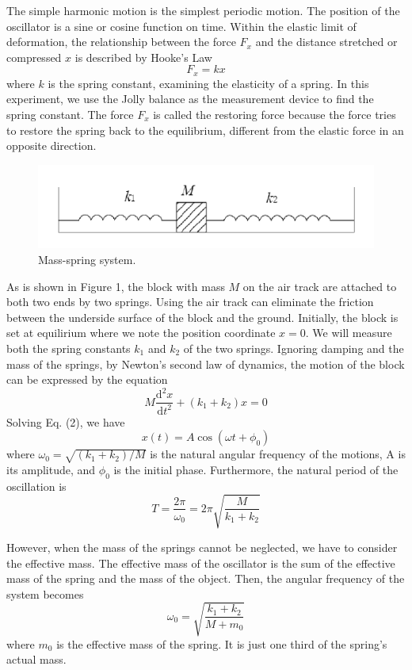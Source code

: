 \documentclass[a4paper]{report}
\begin{document}
	The simple harmonic motion is the simplest periodic motion. The position of the oscillator is a sine or cosine function on time. Within the elastic limit of deformation, the relationship between the force $F_x$ and the distance stretched or compressed $x$ is described by Hooke's Law
	\begin{equation}
	F_x=kx
	\end{equation}
	where $k$ is the spring constant, examining the elasticity of a spring. In this experiment, we use the Jolly balance as the measurement device to find the spring constant. The force $F_x$ is called the restoring force because the force tries to restore the spring back to the equilibrium, different from the elastic force in an opposite direction.
	\begin{figure}[H]
		\centering
		\includegraphics[width=0.5\linewidth]{1.png}
		\caption{Mass-spring system.}
	\end{figure}
	As is shown in Figure 1, the block with mass $M$ on the air track are attached to both two ends by two springs. Using the air track can eliminate the friction between the underside surface of the block and the ground. Initially, the block is set at equilirium where we note the position coordinate $x=0$. We will measure both the spring constants $k_1$ and $k_2$ of the two springs. Ignoring damping and the mass of the springs, by Newton's second law of dynamics, the motion of the block can be expressed by the equation
	\begin{equation}
	M\dfrac{\mathrm{d}^2x}{\mathrm{d}t^2}+(k_1+k_2)x=0
	\end{equation}
	Solving Eq. (2), we have
	\begin{equation}
	x(t)=A\cos(\omega t+\phi_0)
	\end{equation}
	where $\omega_0=\sqrt{(k_1+k_2)/M}$ is the natural angular frequency of the motions, A is its amplitude, and $\phi_0$ is the initial phase. Furthermore, the natural period of the oscillation is
	\begin{equation}
	T=\dfrac{2\pi}{\omega_0}=2\pi\sqrt{\dfrac{M}{k_1+k_2}}
	\end{equation}
	
	However,  when the mass of the springs cannot be neglected, we have to consider the effective mass. The effective mass of the oscillator is the sum of the effective mass of the spring and the mass of the object. Then, the angular frequency of the system becomes
	\begin{equation}
	\omega_0=\sqrt{\dfrac{k_1+k_2}{M+m_0}}
	\end{equation}
	where $m_0$ is the effective mass of the spring. It is just one third of the spring's actual mass.
	
\end{document}
